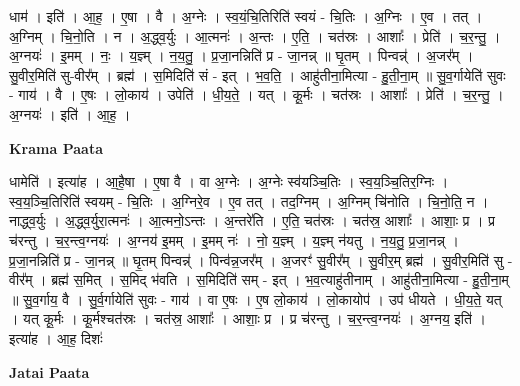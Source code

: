\documentclass[17pt]{extarticle}
\begin{document}
धाम॑ । इति॑ । आ॒ह॒ । ए॒षा । वै । अ॒ग्नेः । स्व॒यं॒चि॒तिरिति॑ स्वयं - चि॒तिः । अ॒ग्निः । ए॒व । तत् । अ॒ग्निम् । चि॒नो॒ति । न । अ॒द्ध्व॒र्युः । आ॒त्मनः॑ । अ॒न्तः । ए॒ति॒ । चत॑स्रः । आशाः᳚ । प्रेति॑ । च॒र॒न्तु॒ । अ॒ग्नयः॑ । इ॒मम् । नः॒ । य॒ज्ञ्म् । न॒य॒तु॒ । प्र॒जा॒नन्निति॑ प्र - जा॒नन्न् ॥ घृ॒तम् । पिन्वन्न्॑ । अ॒जर᳚म् । सु॒वीर॒मिति॑ सु-वीर᳚म् । ब्रह्म॑ । स॒मिदिति॑ सं - इत् । भ॒व॒ति॒ । आहु॑तीना॒मित्या - हु॒ती॒ना॒म् ॥ सु॒व॒र्गायेति॑ सुवः - गाय॑ । वै । ए॒षः । लो॒काय॑ । उपेति॑ । धी॒य॒ते॒ । यत् । कू॒र्मः । चत॑स्रः । आशाः᳚ । प्रेति॑ । च॒र॒न्तु॒ । अ॒ग्नयः॑ । इति॑ । आ॒ह॒ ।  \newline


\textbf{Krama Paata} \newline

धामेति॑ । इत्या॑ह । आ॒है॒षा । ए॒षा वै । वा अ॒ग्नेः । अ॒ग्नेः स्व॑यञ्चि॒तिः । स्व॒य॒ञ्चि॒तिर॒ग्निः । स्व॒य॒ञ्चि॒तिरिति॑ स्वयम् - चि॒तिः । अ॒ग्निरे॒व । ए॒व तत् । तद॒ग्निम् । अ॒ग्निम् चि॑नोति । चि॒नो॒ति॒ न । नाद्ध्व॒र्युः । अ॒द्ध्व॒र्युरा॒त्मनः॑ । आ॒त्मनो॒ऽन्तः । अ॒न्तरे॑ति । ए॒ति॒ चत॑स्रः । चत॑स्र॒ आशाः᳚ । आशाः॒ प्र । प्र च॑रन्तु । च॒र॒न्त्व॒ग्नयः॑ । अ॒ग्नय॑ इ॒मम् । इ॒मम् नः॑ । नो॒ य॒ज्ञ्म् । य॒ज्ञ्म् न॑यतु । न॒य॒तु॒ प्र॒जा॒नन्न् । प्र॒जा॒नन्निति॑ प्र - जा॒नन्न् ॥ घृ॒तम् पिन्वन्न्॑ । पिन्व॑न्न॒जर᳚म् । अ॒जरꣳ॑ सु॒वीर᳚म् । सु॒वीर॒म् ब्रह्म॑ । सु॒वीर॒मिति॑ सु - वीर᳚म् । ब्रह्म॑ स॒मित् । स॒मिद् भ॑वति । स॒मिदिति॑ सम् - इत् । भ॒व॒त्याहु॑तीनाम् । आहु॑तीना॒मित्या - हु॒ती॒ना॒म् ॥ सु॒व॒र्गाय॒ वै । सु॒र्व॒र्गायेति॑ सुवः - गाय॑ । वा ए॒षः । ए॒ष लो॒काय॑ । लो॒कायोप॑ । उप॑ धीयते । धी॒य॒ते॒ यत् । यत् कू॒र्मः । कू॒र्मश्चत॑स्रः । चत॑स्र॒ आशाः᳚ । आशाः॒ प्र । प्र च॑रन्तु । च॒र॒न्त्व॒ग्नयः॑ । अ॒ग्नय॒ इति॑ । इत्या॑ह । आ॒ह॒ दिशः॑ \newline

\textbf{Jatai Paata} \newline
\end{document}

